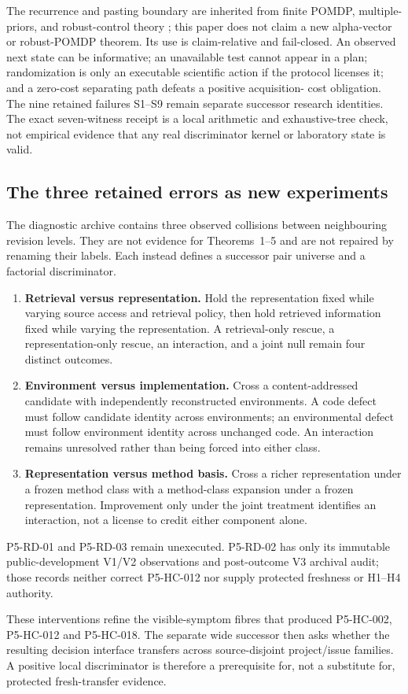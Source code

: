 The recurrence and pasting boundary are inherited from finite POMDP,
multiple-priors, and robust-control theory
\cite{smallwood1973,iyengar2005,nakao2021}; this paper does not claim a new alpha-vector
or robust-POMDP theorem.  Its use is claim-relative and fail-closed.  An
observed next state can be informative; an unavailable test cannot appear in a
plan; randomization is only an executable scientific action if the protocol
licenses it; and a zero-cost separating path defeats a positive acquisition-
cost obligation.  The nine retained failures S1--S9 remain separate successor
research identities.  The exact seven-witness receipt is a local arithmetic
and exhaustive-tree check, not empirical evidence that any real discriminator
kernel or laboratory state is valid.

\subsection{The three retained errors as new experiments}

The diagnostic archive contains three observed collisions between neighbouring
revision levels. They are not evidence for Theorems~1--5 and are not repaired
by renaming their labels. Each instead defines a successor pair universe and a
factorial discriminator.

\begin{enumerate}
  \item \textbf{Retrieval versus representation.} Hold the representation
  fixed while varying source access and retrieval policy, then hold retrieved
  information fixed while varying the representation. A retrieval-only rescue,
  a representation-only rescue, an interaction, and a joint null remain four
  distinct outcomes.
  \item \textbf{Environment versus implementation.} Cross a content-addressed
  candidate with independently reconstructed environments. A code defect must
  follow candidate identity across environments; an environmental defect must
  follow environment identity across unchanged code. An interaction remains
  unresolved rather than being forced into either class.
  \item \textbf{Representation versus method basis.} Cross a richer
  representation under a frozen method class with a method-class expansion
  under a frozen representation. Improvement only under the joint treatment
  identifies an interaction, not a license to credit either component alone.
\end{enumerate}

P5-RD-01 and P5-RD-03 remain unexecuted. P5-RD-02 has only its immutable
public-development V1/V2 observations and post-outcome V3 archival audit; those
records neither correct P5-HC-012 nor supply protected freshness or H1--H4
authority.

These interventions refine the visible-symptom fibres that produced
P5-HC-002, P5-HC-012 and P5-HC-018. The separate wide successor then asks
whether the resulting decision interface transfers across source-disjoint
project/issue families. A positive local discriminator is therefore a
prerequisite for, not a substitute for, protected fresh-transfer evidence.
